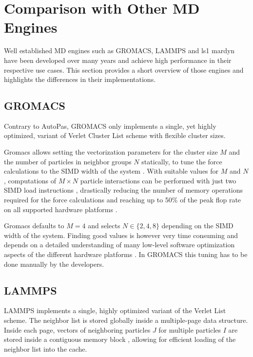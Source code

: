 \documentclass[conference]{IEEEtran}
\begin{document}
\section{Comparison with Other MD Engines}

Well established MD engines such as GROMACS, LAMMPS and ls1 mardyn have been developed over many years and achieve high performance in their respective use cases. This section provides a short overview of those engines and highlights the differences in their implementations.

\subsection{GROMACS}

Contrary to AutoPas, GROMACS only implements a single, yet highly optimized, variant of Verlet Cluster List scheme with flexible cluster sizes.

Gromacs allows setting the vectorization parameters for the cluster size $M$ and the number of particles in neighbor groups $N$ statically, to tune the force calculations to the SIMD width of the system \cite{PALL20132641}. With suitable values for $M$ and $N$, computations of $M \times N$ particle interactions can be performed with just two SIMD load instructions \cite{Solving_Software_Challenges_Exascale_2014}, drastically reducing the number of memory operations required for the force calculations and reaching up to 50\% of the peak flop rate on all supported hardware platforms \cite{Solving_Software_Challenges_Exascale_2014}.

Gromacs defaults to $M=4$ and selects $N \in \{2, 4, 8\}$ depending on the SIMD width of the system. Finding good values is however very time consuming and depends on a detailed understanding of many low-level software optimization aspects of the different hardware platforms \cite{PALL20132641}. In GROMACS this tuning has to be done manually by the developers.

\subsection{LAMMPS}

LAMMPS implements a single, highly optimized variant of the Verlet List scheme. The neighbor list is stored globally inside a multiple-page data structure. Inside each page, vectors of neighboring particles $J$ for multiple particles $I$ are stored inside a contiguous memory block \cite{THOMPSON2022108171}, allowing for efficient loading of the neighbor list into the cache.
\end{document}
